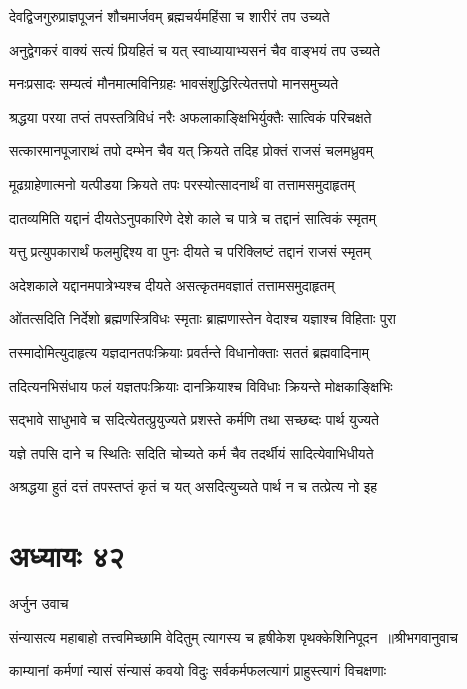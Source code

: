 \twolineshloka
{देवद्विजगुरुप्राज्ञपूजनं शौचमार्जवम्}
{ब्रह्मचर्यमहिंसा च शारीरं तप उच्यते}


\twolineshloka
{अनुद्वेगकरं वाक्यं सत्यं प्रियहितं च यत्}
{स्वाध्यायाभ्यसनं चैव वाङ्भयं तप उच्यते}


\twolineshloka
{मनःप्रसादः सम्यत्वं मौनमात्मविनिग्रहः}
{भावसंशुद्धिरित्येतत्तपो मानसमुच्यते}


\twolineshloka
{श्रद्धया परया तप्तं तपस्तत्रिविधं नरैः}
{अफलाकाङ्क्षिभिर्युक्तैः सात्विकं परिचक्षते}


\twolineshloka
{सत्कारमानपूजाराथं तपो दम्भेन चैव यत्}
{क्रियते तदिह प्रोक्तं राजसं चलमध्रुवम्}


\twolineshloka
{मूढग्राहेणात्मनो यत्पीडया क्रियते तपः}
{परस्योत्सादनार्थं वा तत्तामसमुदाहृतम्}


\twolineshloka
{दातव्यमिति यद्दानं दीयतेऽनुपकारिणे}
{देशे काले च पात्रे च तद्दानं सात्विकं स्मृतम्}


\twolineshloka
{यत्तु प्रत्युपकारार्थं फलमुद्दिश्य वा पुनः}
{दीयते च परिक्लिष्टं तद्दानं राजसं स्मृतम्}


\twolineshloka
{अदेशकाले यद्दानमपात्रेभ्यश्च दीयते}
{असत्कृतमवज्ञातं तत्तामसमुदाहृतम्}


\twolineshloka
{ओंतत्सदिति निर्देशो ब्रह्मणस्त्रिविधः स्मृताः}
{ब्राह्मणास्तेन वेदाश्च यज्ञाश्च विहिताः पुरा}


\twolineshloka
{तस्मादोमित्युदाहृत्य यज्ञदानतपःक्रियाः}
{प्रवर्तन्ते विधानोक्ताः सततं ब्रह्मवादिनाम्}


\twolineshloka
{तदित्यनभिसंधाय फलं यज्ञतपःक्रियाः}
{दानक्रियाश्च विविधाः क्रियन्ते मोक्षकाङ्क्षिभिः}


\twolineshloka
{सद्भावे साधुभावे च सदित्येतत्प्रुयुज्यते}
{प्रशस्ते कर्मणि तथा सच्छब्दः पार्थ युज्यते}


\twolineshloka
{यज्ञे तपसि दाने च स्थितिः सदिति चोच्यते}
{कर्म चैव तदर्थीयं सादित्येवाभिधीयते}


\twolineshloka
{अश्रद्धया हुतं दत्तं तपस्तप्तं कृतं च यत्}
{असदित्युच्यते पार्थ न च तत्प्रेत्य नो इह}


\chapter{अध्यायः ४२}
\twolineshloka
{अर्जुन उवाच}
{}


\threelineshloka
{संन्यासत्य महाबाहो तत्त्वमिच्छामि वेदितुम्}
{त्यागस्य च हृषीकेश पृथक्केशिनिपूदन ॥श्रीभगवानुवाच}
{}


\twolineshloka
{काम्यानां कर्मणां न्यासं संन्यासं कवयो विदुः}
{सर्वकर्मफलत्यागं प्राहुस्त्यागं विचक्षणाः}


